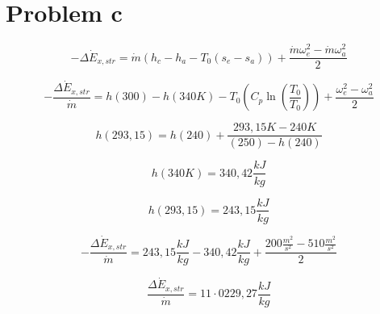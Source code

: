 \section*{Problem c}

\begin{equation*}
- \Delta \dot{E}_{x,str} = \dot{m} (h_c - h_a - T_0 (s_e - s_a)) + \frac{\dot{m} \omega_e^2 - \dot{m} \omega_a^2}{2}
\end{equation*}

\begin{equation*}
- \frac{\Delta \dot{E}_{x,str}}{\dot{m}} = h(300) - h(340K) - T_0 \left( C_p \ln \left( \frac{T_0}{T_0} \right) \right) + \frac{\omega_e^2 - \omega_a^2}{2}
\end{equation*}

\begin{equation*}
h(293,15) = h(240) + \frac{293,15K - 240K}{(250) - h(240)}
\end{equation*}

\begin{equation*}
h(340K) = 340,42 \frac{kJ}{kg}
\end{equation*}

\begin{equation*}
h(293,15) = 243,15 \frac{kJ}{kg}
\end{equation*}

\begin{equation*}
- \frac{\Delta \dot{E}_{x,str}}{\dot{m}} = 243,15 \frac{kJ}{kg} - 340,42 \frac{kJ}{kg} + \frac{200 \frac{m^2}{s^2} - 510 \frac{m^2}{s^2}}{2}
\end{equation*}

\begin{equation*}
\frac{\Delta \dot{E}_{x,str}}{\dot{m}} = 11 \cdot 0229,27 \frac{kJ}{kg}
\end{equation*}
